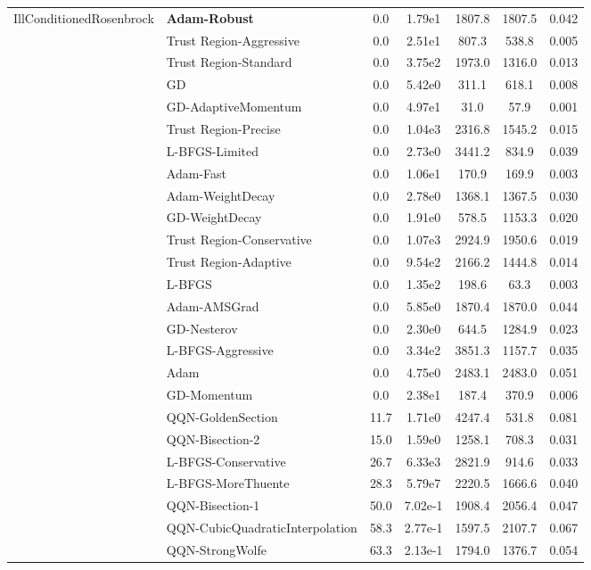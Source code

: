 \documentclass{article}
\begin{document}
\begin{table}[htbp]
{\begin{tabular}{p{2.5cm}p{2.5cm}*{5}{c}}
\midrule
\multirow{25}{*}{IllConditionedRosenbrock} & \textbf{Adam-Robust} & 0.0 & 1.79e1 & 1807.8 & 1807.5 & 0.042 \\
 & Trust Region-Aggressive & 0.0 & 2.51e1 & 807.3 & 538.8 & 0.005 \\
 & Trust Region-Standard & 0.0 & 3.75e2 & 1973.0 & 1316.0 & 0.013 \\
 & GD & 0.0 & 5.42e0 & 311.1 & 618.1 & 0.008 \\
 & GD-AdaptiveMomentum & 0.0 & 4.97e1 & 31.0 & 57.9 & 0.001 \\
 & Trust Region-Precise & 0.0 & 1.04e3 & 2316.8 & 1545.2 & 0.015 \\
 & L-BFGS-Limited & 0.0 & 2.73e0 & 3441.2 & 834.9 & 0.039 \\
 & Adam-Fast & 0.0 & 1.06e1 & 170.9 & 169.9 & 0.003 \\
 & Adam-WeightDecay & 0.0 & 2.78e0 & 1368.1 & 1367.5 & 0.030 \\
 & GD-WeightDecay & 0.0 & 1.91e0 & 578.5 & 1153.3 & 0.020 \\
 & Trust Region-Conservative & 0.0 & 1.07e3 & 2924.9 & 1950.6 & 0.019 \\
 & Trust Region-Adaptive & 0.0 & 9.54e2 & 2166.2 & 1444.8 & 0.014 \\
 & L-BFGS & 0.0 & 1.35e2 & 198.6 & 63.3 & 0.003 \\
 & Adam-AMSGrad & 0.0 & 5.85e0 & 1870.4 & 1870.0 & 0.044 \\
 & GD-Nesterov & 0.0 & 2.30e0 & 644.5 & 1284.9 & 0.023 \\
 & L-BFGS-Aggressive & 0.0 & 3.34e2 & 3851.3 & 1157.7 & 0.035 \\
 & Adam & 0.0 & 4.75e0 & 2483.1 & 2483.0 & 0.051 \\
 & GD-Momentum & 0.0 & 2.38e1 & 187.4 & 370.9 & 0.006 \\
 & QQN-GoldenSection & 11.7 & 1.71e0 & 4247.4 & 531.8 & 0.081 \\
 & QQN-Bisection-2 & 15.0 & 1.59e0 & 1258.1 & 708.3 & 0.031 \\
 & L-BFGS-Conservative & 26.7 & 6.33e3 & 2821.9 & 914.6 & 0.033 \\
 & L-BFGS-MoreThuente & 28.3 & 5.79e7 & 2220.5 & 1666.6 & 0.040 \\
 & QQN-Bisection-1 & 50.0 & 7.02e-1 & 1908.4 & 2056.4 & 0.047 \\
 & QQN-CubicQuadraticInterpolation & 58.3 & 2.77e-1 & 1597.5 & 2107.7 & 0.067 \\
 & QQN-StrongWolfe & 63.3 & 2.13e-1 & 1794.0 & 1376.7 & 0.054 \\

\end{tabular}}
\end{table}
\end{document}

